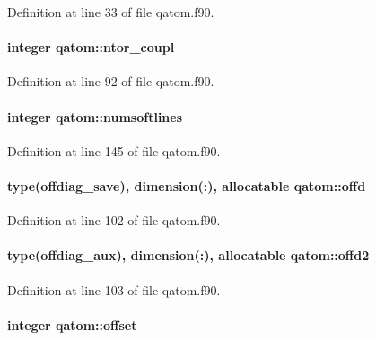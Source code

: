 Definition at line 33 of file qatom.\-f90.

\hypertarget{classqatom_ad94d81bad971192e231778440b5d818c}{
\paragraph[{ntor\-\_\-coupl}]{\setlength{\rightskip}{0pt plus 5cm}integer qatom\-::ntor\-\_\-coupl}}\label{classqatom_ad94d81bad971192e231778440b5d818c}


Definition at line 92 of file qatom.\-f90.

\hypertarget{classqatom_a71b6ebba3830ff9fe1f2066c379301bd}{
\paragraph[{numsoftlines}]{\setlength{\rightskip}{0pt plus 5cm}integer qatom\-::numsoftlines}}\label{classqatom_a71b6ebba3830ff9fe1f2066c379301bd}


Definition at line 145 of file qatom.\-f90.

\hypertarget{classqatom_a9cb55eb282cdfb465aafddab998a1669}{
\paragraph[{offd}]{\setlength{\rightskip}{0pt plus 5cm}type(offdiag\-\_\-save), dimension(\-:), allocatable qatom\-::offd}}\label{classqatom_a9cb55eb282cdfb465aafddab998a1669}


Definition at line 102 of file qatom.\-f90.

\hypertarget{classqatom_ab508173c538653aec2949bedb6858896}{
\paragraph[{offd2}]{\setlength{\rightskip}{0pt plus 5cm}type(offdiag\-\_\-aux), dimension(\-:), allocatable qatom\-::offd2}}\label{classqatom_ab508173c538653aec2949bedb6858896}


Definition at line 103 of file qatom.\-f90.

\hypertarget{classqatom_abb91d88c31c0e0523c8d566cc351f656}{
\paragraph[{offset}]{\setlength{\rightskip}{0pt plus 5cm}integer qatom\-::offset}}\label{classqatom_abb91d88c31c0e0523c8d566cc351f656}


